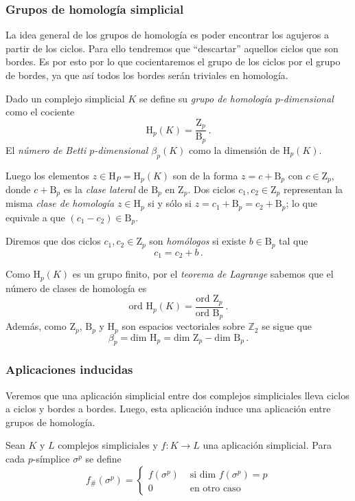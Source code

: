 \subsubsection*{Grupos de homología simplicial}
La idea general de los grupos de homología es poder encontrar los agujeros a partir de los ciclos. Para ello tendremos que ``descartar'' aquellos ciclos que son bordes. Es por esto por lo que cocientaremos el grupo de los ciclos por el grupo de bordes, ya que así todos los bordes serán triviales en homología.

\begin{definition}
Dado un complejo simplicial $K$ se define su \emph{grupo de homología $p$-dimensional} como el cociente
\[
\text{H}_p(K)=\dfrac{\text{Z}_p}{\text{B}_p}\,.
\]
El \emph{número de Betti $p$-dimensional $\beta_p(K)$} como la dimensión de $\text{H}_p(K)$. 
\end{definition}

Luego los elementos $z \in \text{H}_P = \text{H}_p(K)$ son de la forma $z = c + \text{B}_p$ con $c \in \text{Z}_p$, donde $c + \text{B}_p$ es la \emph{clase lateral} de $\text{B}_p$ en $\text{Z}_p$. Dos ciclos $c_1, c_2 \in \text{Z}_p$ representan la misma \emph{clase de homología} $z \in \text{H}_p$ si y sólo si $z= c_1 + \text{B}_p = c_2 + \text{B}_p$; lo que equivale a que $(c_1-c_2) \in \text{B}_p$.

\begin{definition}
Diremos que dos ciclos $c_1, c_2 \in \text{Z}_p$ son \emph{homólogos} si existe $b \in \text{B}_p$ tal que 
\[
c_1 = c_2 + b\,.
\]
\end{definition}

Como $\text{H}_p(K)$ es un grupo finito, por el \emph{teorema de Lagrange} sabemos que el número de clases de homología es
\[
\text{ord } \text{H}_p(K) = \dfrac{\text{ord }  \text{Z}_p}{\text{ord } \text{B}_p}\,.
\]
Además, como $\text{Z}_p$, $\text{B}_p$ y $\text{H}_p$ son espacios vectoriales sobre $\mathbb{Z}_2$ se sigue que 
\[
\beta_p = \text{dim } \text{H}_p = \text{dim } \text{Z}_p - \text{dim } \text{B}_p\,.
\] 

\subsubsection*{Aplicaciones inducidas}
Veremos que una aplicación simplicial entre dos complejos simpliciales lleva ciclos a ciclos y bordes a bordes. Luego, esta aplicación induce una aplicación entre grupos de homología.

Sean $K$ y $L$ complejos simpliciales y $f: K \to L$ una aplicación simplicial. Para cada $p$-símplice $\sigma^p$ se define
\[
f_{\#}(\sigma^p) = 
\begin{cases}
f(\sigma^p)	& \text{ si } \text{dim } f(\sigma^p) = p \\ 
0 			& \text{ en otro caso }
\end{cases}
\]

